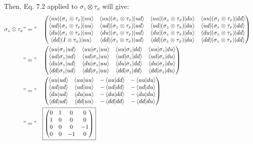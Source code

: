 \documentclass[solutions.tex]{subfiles}
\begin{document}
Then, Eq. $7.2$ applied to $\sigma_z\otimes\tau_x$ will give:
\begin{equation*}\begin{aligned}
	\sigma_z\otimes\tau_x &"="&& \begin{pmatrix}
		\langle uu|(\sigma_z\otimes\tau_x)|uu\rangle
			& \langle uu|(\sigma_z\otimes\tau_x)|ud\rangle
			& \langle uu|(\sigma_z\otimes\tau_x)|du\rangle
			& \langle uu|(\sigma_z\otimes\tau_x)|dd\rangle \\
		\langle ud|(\sigma_z\otimes\tau_x)|uu\rangle
			& \langle ud|(\sigma_z\otimes\tau_x)|ud\rangle
			& \langle ud|(\sigma_z\otimes\tau_x)|du\rangle
			& \langle ud|(\sigma_z\otimes\tau_x)|dd\rangle \\
		\langle du|(\sigma_z\otimes\tau_x)|uu\rangle
			& \langle du|(\sigma_z\otimes\tau_x)|ud\rangle
			& \langle du|(\sigma_z\otimes\tau_x)|du\rangle
			& \langle du|(\sigma_z\otimes\tau_x)|dd\rangle \\
		\langle dd|(I\otimes\tau_x)|uu\rangle
			& \langle dd|(\sigma_z\otimes\tau_x)|ud\rangle
			& \langle dd|(\sigma_z\otimes\tau_x)|du\rangle
			& \langle dd|(\sigma_z\otimes\tau_x)|dd\rangle \\
	\end{pmatrix} \\
	~ &"="&& \begin{pmatrix}
		\langle uu|\sigma_z|ud\rangle & \langle uu|\sigma_z|uu\rangle
			& \langle uu|\sigma_z|dd\rangle & \langle uu|\sigma_z|du\rangle \\
		\langle ud|\sigma_z|ud\rangle & \langle ud|\sigma_z|uu\rangle
			& \langle ud|\sigma_z|dd\rangle & \langle ud|\sigma_z|du\rangle \\
		\langle du|\sigma_z|ud\rangle & \langle du|\sigma_z|uu\rangle
			& \langle du|\sigma_z|dd\rangle & \langle du|\sigma_z|du\rangle \\
		\langle dd|\sigma_z|ud\rangle & \langle dd|\sigma_z|uu\rangle
			& \langle dd|\sigma_z|dd\rangle & \langle dd|\sigma_z|du\rangle \\
	\end{pmatrix} \\
	~ &"="&& \begin{pmatrix}
		\left\langle uu \middle| ud \right\rangle & \left\langle uu \middle| uu \right\rangle & -\left\langle uu \middle| dd \right\rangle & -\left\langle uu \middle| du \right\rangle \\
		\left\langle ud \middle| ud \right\rangle & \left\langle ud \middle| uu \right\rangle & -\left\langle ud \middle| dd \right\rangle & -\left\langle ud \middle| du \right\rangle \\
		\left\langle du \middle| ud \right\rangle & \left\langle du \middle| uu \right\rangle & -\left\langle du \middle| dd \right\rangle & -\left\langle du \middle| du \right\rangle \\
		\left\langle dd \middle| ud \right\rangle & \left\langle dd \middle| uu \right\rangle & -\left\langle dd \middle| dd \right\rangle & -\left\langle dd \middle| du \right\rangle \\
	\end{pmatrix} \\
	~ &"="&& \boxed{\begin{pmatrix}
		0 & 1 & 0 & 0 \\
		1 & 0 & 0 & 0 \\
		0 & 0 & 0 & -1 \\
		0 & 0 & -1 & 0 \\
	\end{pmatrix}} \\
\end{aligned}\end{equation*}
\end{document}
